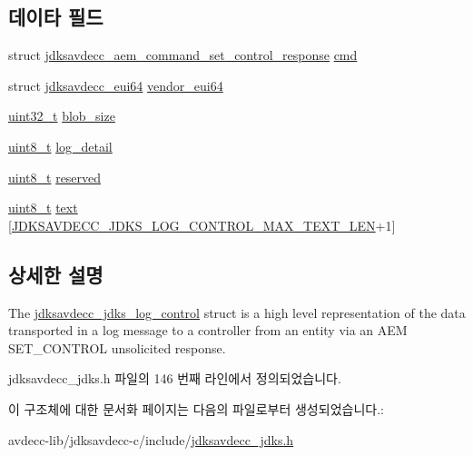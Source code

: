 \subsection*{데이타 필드}
\begin{DoxyCompactItemize}
\item 
struct \hyperlink{structjdksavdecc__aem__command__set__control__response}{jdksavdecc\+\_\+aem\+\_\+command\+\_\+set\+\_\+control\+\_\+response} \hyperlink{group__jdks_ga38de55b081b42c70b4caeb189e999cef}{cmd}
\item 
struct \hyperlink{structjdksavdecc__eui64}{jdksavdecc\+\_\+eui64} \hyperlink{group__jdks_ga6183c85748a8af0003d293d653c4ae9b}{vendor\+\_\+eui64}
\item 
\hyperlink{parse_8c_a6eb1e68cc391dd753bc8ce896dbb8315}{uint32\+\_\+t} \hyperlink{group__jdks_ga32143551b70893faef60f6e35f88ed50}{blob\+\_\+size}
\item 
\hyperlink{stdint_8h_aba7bc1797add20fe3efdf37ced1182c5}{uint8\+\_\+t} \hyperlink{group__jdks_ga61044f81305d515f41eea13f02f3cb81}{log\+\_\+detail}
\item 
\hyperlink{stdint_8h_aba7bc1797add20fe3efdf37ced1182c5}{uint8\+\_\+t} \hyperlink{group__jdks_gacb7bc06bed6f6408d719334fc41698c7}{reserved}
\item 
\hyperlink{stdint_8h_aba7bc1797add20fe3efdf37ced1182c5}{uint8\+\_\+t} \hyperlink{group__jdks_ga77513c59b654d8ce1e07a7f3bcdf70db}{text} \mbox{[}\hyperlink{group__jdks__log_gaaa43d62d581d06b4c563a3ac9f689730}{J\+D\+K\+S\+A\+V\+D\+E\+C\+C\+\_\+\+J\+D\+K\+S\+\_\+\+L\+O\+G\+\_\+\+C\+O\+N\+T\+R\+O\+L\+\_\+\+M\+A\+X\+\_\+\+T\+E\+X\+T\+\_\+\+L\+EN}+1\mbox{]}
\end{DoxyCompactItemize}


\subsection{상세한 설명}
The \hyperlink{structjdksavdecc__jdks__log__control}{jdksavdecc\+\_\+jdks\+\_\+log\+\_\+control} struct is a high level representation of the data transported in a log message to a controller from an entity via an A\+EM S\+E\+T\+\_\+\+C\+O\+N\+T\+R\+OL unsolicited response. 

jdksavdecc\+\_\+jdks.\+h 파일의 146 번째 라인에서 정의되었습니다.



이 구조체에 대한 문서화 페이지는 다음의 파일로부터 생성되었습니다.\+:\begin{DoxyCompactItemize}
\item 
avdecc-\/lib/jdksavdecc-\/c/include/\hyperlink{jdksavdecc__jdks_8h}{jdksavdecc\+\_\+jdks.\+h}\end{DoxyCompactItemize}

